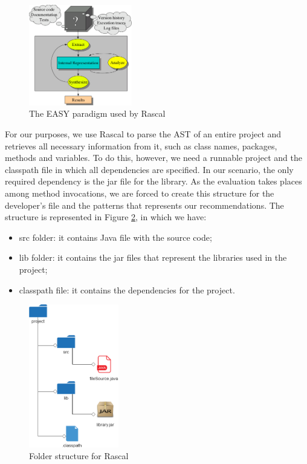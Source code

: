 \begin{figure}[!h]
\includegraphics[width=0.40\textwidth]{images/EASY.png}
\centering
  \caption{The EASY paradigm used by Rascal}
  \label{fig:EASY}
\end{figure}

For our purposes, we use Rascal to parse the AST of an entire project and retrieves all necessary information from it, such as class names, packages, methods and variables. To do this, however, we need a runnable project and the classpath file in which all dependencies are specified. In our scenario, the only required dependency is the jar file for the library. As the evaluation takes places among method invocations, we are forced to create this structure for the developer's file and the patterns that represents our recommendations. The structure is represented in Figure \ref{fig:FolderStructure}, in which we have:

\begin{itemize}
\item src folder: it contains Java file with the source code;
\item lib folder: it contains the jar files that represent the libraries used in the project;
\item classpath file: it contains the dependencies for the project.
\end{itemize}


\begin{figure}[!h]
\includegraphics[width=0.35\textwidth]{images/Folders.png}
\centering
  \caption{Folder structure for Rascal}
  \label{fig:FolderStructure}
\end{figure}

